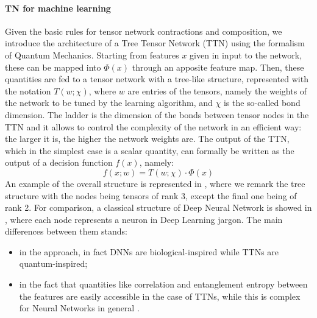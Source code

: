 \documentclass[../main/main.tex]{subfiles}
\begin{document}
\paragraph{TN for machine learning}
Given the basic rules for tensor network contractions and composition, we introduce the architecture of a Tree Tensor Network (TTN) using the formalism of Quantum Mechanics. Starting from features \( x \) given in input to the network, these can be mapped into \( \Phi(x) \) through an apposite feature map. Then, these quantities are fed to a tensor network with a tree-like structure, represented with the notation \( T(w;\chi) \), where \( w \) are entries of the tensors, namely the weights of the network to be tuned by the learning algorithm, and \( \chi \) is the so-called bond dimension. The ladder is the dimension of the bonds between tensor nodes in the TTN and it allows to control the complexity of the network in an efficient way: the larger it is, the higher the network weights are. The output of the TTN, which in the simplest case is a scalar quantity, can formally be written as the output of a decision function \( f(x) \), namely:
\begin{equation}
    f(x;w)
    =
    T(w;\chi) \cdot \Phi(x)
\end{equation}
An example of the overall structure is represented in , where we remark the tree structure with the nodes being tensors of rank 3, except the final one being of rank 2. For comparison, a classical structure of Deep Neural Network is showed in , where each node represents a neuron in Deep Learning jargon. The main differences between them stands:
\begin{itemize}
    \item in the approach, in fact DNNs are biological-inspired while TTNs are quantum-inspired;
    \item in the fact that quantities like correlation and entanglement entropy between the features are easily accessible in the case of TTNs, while this is complex for Neural Networks in general \cite{montangero}.
\end{itemize}
\end{document}
